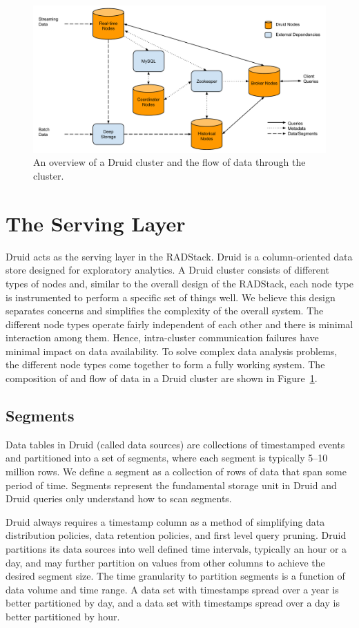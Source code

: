 \documentclass{vldb}
\begin{document}
\begin{figure}
\centering
\includegraphics[width = 4.5in]{cluster}
\caption{An overview of a Druid cluster and the flow of data through the cluster.}
\label{fig:cluster}
\end{figure}

\section{The Serving Layer}
\label{sec:serving}
Druid acts as the serving layer in the RADStack. Druid is a column-oriented
data store designed for exploratory analytics. A Druid cluster consists of
different types of nodes and, similar to the overall design of the RADStack,
each node type is instrumented to perform a specific set of things well. We
believe this design separates concerns and simplifies the complexity of the
overall system. The different node types operate fairly independent of each
other and there is minimal interaction among them. Hence, intra-cluster
communication failures have minimal impact on data availability. To solve
complex data analysis problems, the different node types come together to form
a fully working system. The composition of and flow of data in a Druid cluster
are shown in Figure~\ref{fig:cluster}.

\subsection{Segments}
\label{sec:segments}
Data tables in Druid (called data sources) are collections of timestamped
events and partitioned into a set of segments, where each segment is typically
5–10 million rows. We define a segment as a collection of rows of data that
span some period of time. Segments represent the fundamental storage unit in
Druid and Druid queries only understand how to scan segments. 

Druid always requires a timestamp column as a method of simplifying data
distribution policies, data retention policies, and first level query pruning.
Druid partitions its data sources into well defined time intervals, typically
an hour or a day, and may further partition on values from other columns to
achieve the desired segment size. The time granularity to partition segments is
a function of data volume and time range. A data set with timestamps spread
over a year is better partitioned by day, and a data set with timestamps spread
over a day is better partitioned by hour. 
\end{document}
